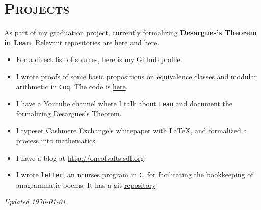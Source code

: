\documentclass[oneside, 10pt]{memoir}
\begin{document}
\section*{\textsc{Projects}}
\begin{tcolorbox}[arc=0pt,outer arc=0pt,left=1pt,right=1pt,top=1pt,bottom=1pt]
    As part of my graduation project, currently formalizing
    \textbf{Desargues's Theorem in Lean}. Relevant repositories are
    \href{https://github.com/oneofvalts/desargues-doc}{here} and
    \href{https://github.com/oneofvalts/desargues}{here}.
\end{tcolorbox}
\begin{itemize}[leftmargin=*]
    \item For a direct list of sources,
        \href{https://github.com/oneofvalts}{here} is my Github profile.
    \item I wrote proofs of some basic propositions on equivalence classes
        and modular arithmetic in \texttt{Coq}. The code is
        \href{https://github.com/oneofvalts/equivalence-classes}{here}.
    \item I have a Youtube
        \href{https://www.youtube.com/@veryarticulateloudthinker}{channel}
        where I talk about \texttt{Lean} and document the formalizing
        Desargues's Theorem.
    \item I typeset Cashmere Exchange's
        whitepaper
        with
        \LaTeX, and formalized a process into mathematics.
    \item I have a blog at \url{http://oneofvalts.sdf.org}.
    \item I wrote \texttt{letter}, an ncurses program in \texttt{C}, for
        facilitating the bookkeeping of anagrammatic poems. It has a git
        \href{https://github.com/oneofvalts/letter}{repository}.
\end{itemize}
\vfill\hfill{}\tiny\textit{Updated \today.}
\end{document}
